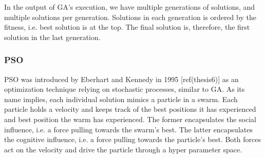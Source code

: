 In the output of GA's execution, we have multiple generations of solutions, and
multiple solutions per generation. Solutions in each generation is ordered by
the fitness, i.e. best solution is at the top. The final solution is, therefore,
the first solution in the last generation.

\subsubsection{PSO}

PSO was introduced by Eberhart and Kennedy in 1995 [ref(thesis6)] as an
optimization technique relying on stochastic processes, similar to GA. As its
name implies, each individual solution mimics a particle in a swarm. Each
particle holds a velocity and keeps track of the best positions it has
experienced and best position the warm has experienced. The former encapsulates
the social influence, i.e. a force pulling towards the swarm's best. The latter
encapsulates the cognitive influence, i.e. a force pulling towards the
particle's best. Both forces act on the velocity and drive the particle through
a hyper parameter space.

